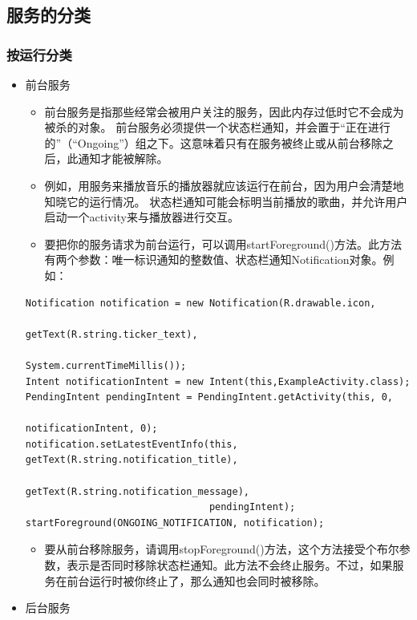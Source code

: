 \documentclass[9pt, b5paper]{article}
\begin{document}
\subsection{服务的分类}
\label{sec-3-3}
\subsubsection{按运行分类}
\label{sec-3-3-1}
\begin{itemize}
\item 前台服务
\begin{itemize}
\item 前台服务是指那些经常会被用户关注的服务，因此内存过低时它不会成为被杀的对象。 前台服务必须提供一个状态栏通知，并会置于“正在进行的”（“Ongoing”）组之下。这意味着只有在服务被终止或从前台移除之后，此通知才能被解除。
\item 例如，用服务来播放音乐的播放器就应该运行在前台，因为用户会清楚地知晓它的运行情况。 状态栏通知可能会标明当前播放的歌曲，并允许用户启动一个activity来与播放器进行交互。
\item 要把你的服务请求为前台运行，可以调用startForeground()方法。此方法有两个参数：唯一标识通知的整数值、状态栏通知Notification对象。例如：
\end{itemize}
\begin{verbatim}
Notification notification = new Notification(R.drawable.icon,
                                             getText(R.string.ticker_text),
                                             System.currentTimeMillis());
Intent notificationIntent = new Intent(this,ExampleActivity.class);
PendingIntent pendingIntent = PendingIntent.getActivity(this, 0,
                                                        notificationIntent, 0);
notification.setLatestEventInfo(this, getText(R.string.notification_title),
                                getText(R.string.notification_message),
                                pendingIntent);
startForeground(ONGOING_NOTIFICATION, notification);
\end{verbatim}
\begin{itemize}
\item 要从前台移除服务，请调用stopForeground()方法，这个方法接受个布尔参数，表示是否同时移除状态栏通知。此方法不会终止服务。不过，如果服务在前台运行时被你终止了，那么通知也会同时被移除。
\end{itemize}
\item 后台服务
\end{itemize}
\end{document}
